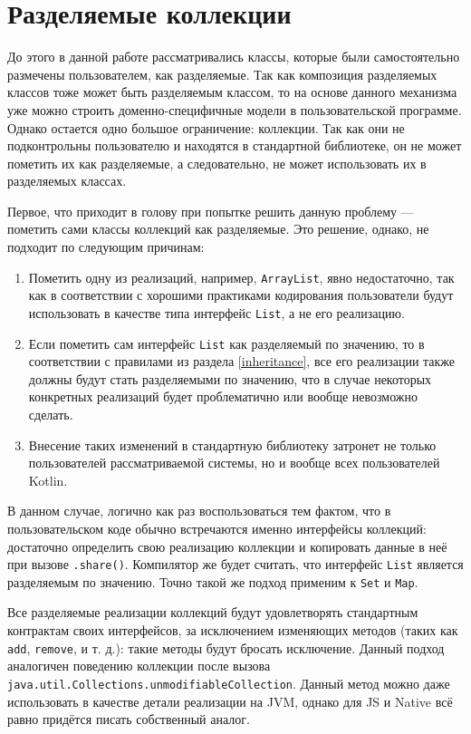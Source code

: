 \documentclass[specification,annotation,times]{itmo-student-thesis}
\begin{document}
\section{Разделяемые коллекции}\label{collections}


До этого в данной работе рассматривались классы, которые были самостоятельно размечены пользователем, как разделяемые.
Так как композиция разделяемых классов тоже может быть разделяемым классом, то на основе данного механизма уже можно строить доменно-специфичные модели в пользовательской программе.
Однако остается одно большое ограничение: коллекции. Так как они не подконтрольны пользователю и находятся в стандартной библиотеке, он не может пометить их как разделяемые, а следовательно, не может использовать их в разделяемых классах.

Первое, что приходит в голову при попытке решить данную проблему --- пометить сами классы коллекций как разделяемые.
Это решение, однако, не подходит по следующим причинам:

\begin{enumerate}
	\item Пометить одну из реализаций, например, \texttt{ArrayList}, явно недостаточно, так как в соответствии с хорошими практиками кодирования пользователи будут использовать в качестве типа интерфейс \texttt{List}, а не его реализацию.
	\item Если пометить сам интерфейс \texttt{List} как разделяемый по значению, то в соответствии с правилами из раздела \ref{inheritance}, все его реализации также должны будут стать разделяемыми по значению, что в случае некоторых конкретных реализаций будет проблематично или вообще невозможно сделать.
	\item Внесение таких изменений в стандартную библиотеку затронет не только пользователей рассматриваемой системы, но и вообще всех пользователей Kotlin.
\end{enumerate}

В данном случае, логично как раз воспользоваться тем фактом, что в пользовательском коде обычно встречаются именно интерфейсы коллекций: достаточно определить свою реализацию коллекции и копировать данные в неё при вызове \texttt{.share()}.
Компилятор же будет считать, что интерфейс \texttt{List} является разделяемым по значению.
Точно такой же подход применим к \texttt{Set} и \texttt{Map}.

Все разделяемые реализации коллекций будут удовлетворять стандартным контрактам своих интерфейсов, за исключением изменяющих методов (таких как \texttt{add}, \texttt{remove}, и т. д.): такие методы будут бросать исключение.
Данный подход аналогичен поведению коллекции после вызова \texttt{java.util.Collections.unmodifiableCollection}. Данный метод можно даже использовать в качестве детали реализации на JVM, однако для JS и Native всё равно придётся писать собственный аналог.
\end{document}
